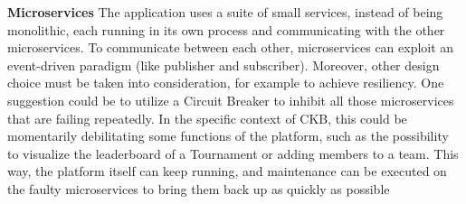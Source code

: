 \textbf{Microservices}\newline
The application uses a suite of small services, instead of being monolithic, 
each running in its own process and communicating with the other microservices. 
To communicate between each other, microservices can exploit an event-driven paradigm (like publisher and subscriber). 
Moreover, other design choice must be taken into consideration, for example to achieve resiliency. 
One suggestion could be to utilize a Circuit Breaker to inhibit all those microservices that are failing repeatedly. 
In the specific context of CKB, this could be momentarily debilitating some functions of the platform, 
such as the possibility to visualize the leaderboard of a Tournament or adding members to a team. 
This way, the platform itself can keep running, and maintenance can be executed on the faulty microservices to bring them back up as quickly as possible


